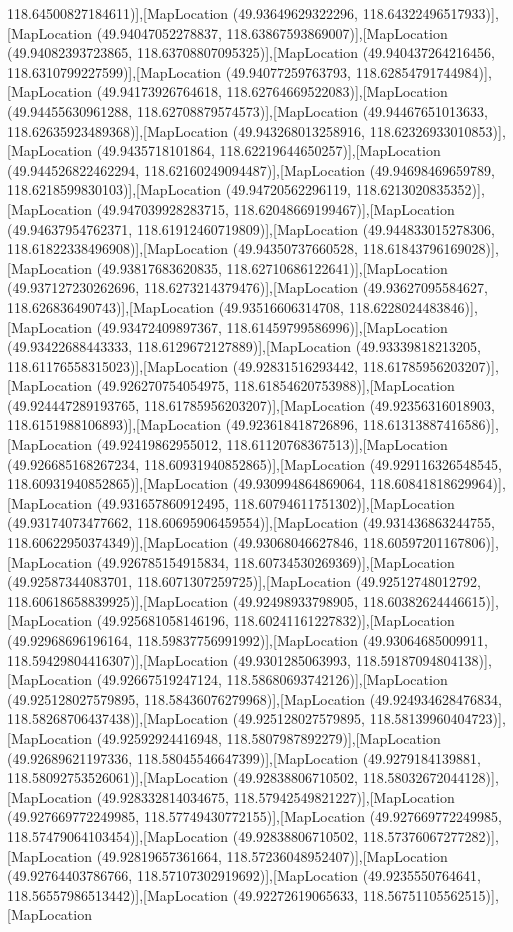118.64500827184611)],[MapLocation (49.93649629322296, 118.64322496517933)],[MapLocation (49.94047052278837, 118.63867593869007)],[MapLocation (49.94082393723865, 118.63708807095325)],[MapLocation (49.940437264216456, 118.6310799227599)],[MapLocation (49.94077259763793, 118.62854791744984)],[MapLocation (49.94173926764618, 118.62764669522083)],[MapLocation (49.94455630961288, 118.62708879574573)],[MapLocation (49.94467651013633, 118.62635923489368)],[MapLocation (49.943268013258916, 118.62326933010853)],[MapLocation (49.9435718101864, 118.62219644650257)],[MapLocation (49.944526822462294, 118.62160249094487)],[MapLocation (49.94698469659789, 118.6218599830103)],[MapLocation (49.94720562296119, 118.6213020835352)],[MapLocation (49.947039928283715, 118.62048669199467)],[MapLocation (49.94637954762371, 118.61912460719809)],[MapLocation (49.944833015278306, 118.61822338496908)],[MapLocation (49.94350737660528, 118.61843796169028)],[MapLocation (49.93817683620835, 118.62710686122641)],[MapLocation (49.937127230262696, 118.6273214379476)],[MapLocation (49.93627095584627, 118.626836490743)],[MapLocation (49.93516606314708, 118.6228024483846)],[MapLocation (49.93472409897367, 118.61459799586996)],[MapLocation (49.93422688443333, 118.6129672127889)],[MapLocation (49.93339818213205, 118.61176558315023)],[MapLocation (49.92831516293442, 118.61785956203207)],[MapLocation (49.926270754054975, 118.61854620753988)],[MapLocation (49.924447289193765, 118.61785956203207)],[MapLocation (49.92356316018903, 118.6151988106893)],[MapLocation (49.923618418726896, 118.61313887416586)],[MapLocation (49.92419862955012, 118.61120768367513)],[MapLocation (49.926685168267234, 118.60931940852865)],[MapLocation (49.929116326548545, 118.60931940852865)],[MapLocation (49.930994864869064, 118.60841818629964)],[MapLocation (49.931657860912495, 118.60794611751302)],[MapLocation (49.93174073477662, 118.60695906459554)],[MapLocation (49.931436863244755, 118.60622950374349)],[MapLocation (49.93068046627846, 118.60597201167806)],[MapLocation (49.926785154915834, 118.60734530269369)],[MapLocation (49.92587344083701, 118.6071307259725)],[MapLocation (49.92512748012792, 118.60618658839925)],[MapLocation (49.92498933798905, 118.60382624446615)],[MapLocation (49.925681058146196, 118.60241161227832)],[MapLocation (49.92968696196164, 118.59837756991992)],[MapLocation (49.93064685009911, 118.59429804416307)],[MapLocation (49.9301285063993, 118.59187094804138)],[MapLocation (49.92667519247124, 118.58680693742126)],[MapLocation (49.925128027579895, 118.58436076279968)],[MapLocation (49.924934628476834, 118.58268706437438)],[MapLocation (49.925128027579895, 118.58139960404723)],[MapLocation (49.92592924416948, 118.5807987892279)],[MapLocation (49.92689621197336, 118.58045546647399)],[MapLocation (49.9279184139881, 118.58092753526061)],[MapLocation (49.92838806710502, 118.58032672044128)],[MapLocation (49.928332814034675, 118.57942549821227)],[MapLocation (49.927669772249985, 118.57749430772155)],[MapLocation (49.927669772249985, 118.57479064103454)],[MapLocation (49.92838806710502, 118.57376067277282)],[MapLocation (49.92819657361664, 118.57236048952407)],[MapLocation (49.92764403786766, 118.57107302919692)],[MapLocation (49.9235550764641, 118.56557986513442)],[MapLocation (49.92272619065633, 118.56751105562515)],[MapLocation 